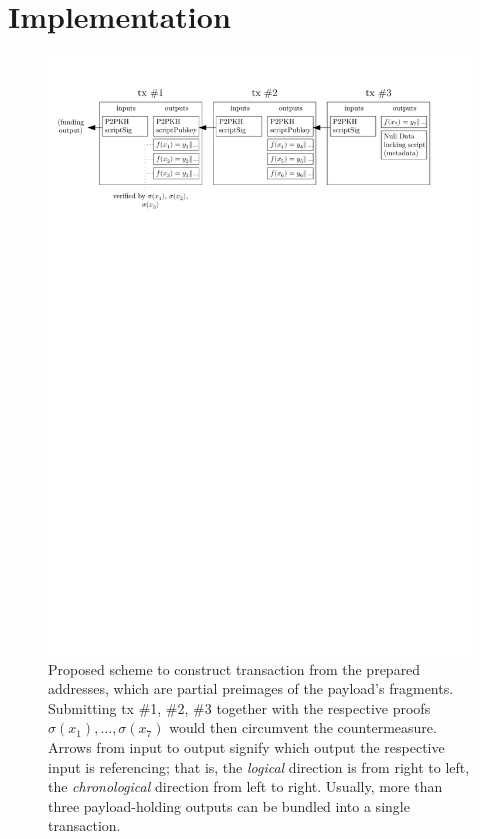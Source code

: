 \documentclass[a4paper,11pt,titlepage]{scrbook}
\begin{document}
\section{Implementation}

\begin{figure}
    \centering
    \includegraphics[width=14cm,keepaspectratio]{figure.pdf}
    \caption[Proposed scheme to construct transaction from the prepared addresses to circumvent the countermeasure]{Proposed scheme to construct transaction from the prepared addresses, which are partial preimages of the payload's fragments. Submitting tx \#1, \#2, \#3 together with the respective proofs $\sigma(x_1), \dots, \sigma(x_7)$ would then circumvent the countermeasure. Arrows from input to output signify which output the respective input is referencing; that is, the \emph{logical} direction is from right to left, the \emph{chronological} direction from left to right. Usually, more than three payload-holding outputs can be bundled into a single transaction.}
    \label{fig:tx-construction}
\end{figure}
\end{document}
